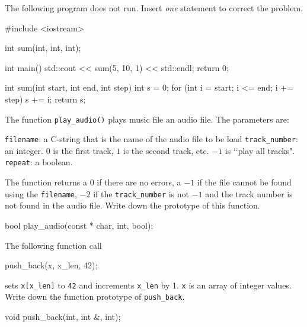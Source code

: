 

\nextq
The following program does not run.
Insert \textit{one} statement to correct the problem.
\\
\ANSWER
\begin{answercode}
#include <iostream>

int sum(int, int, int);
  
int main()
{
    std::cout << sum(5, 10, 1) << std::endl;
    return 0;
}

int sum(int start, int end, int step)
{
    int s = 0;
    for (int i = start; i <= end; i += step)
    {
        s += i;
    }
    return s;
}
\end{answercode}

\nextq
The function \verb!play_audio()! plays music file an audio file. The parameters are:
\begin{enumerate}[nosep]
\li \verb!filename!: a C-string that is the name of the audio file to be load
\li \verb!track_number!: an integer.
$0$ is the first track, $1$ is the second track, etc.
$-1$ is \lq\lq play all tracks".
\li \verb!repeat!: a boolean.
\end{enumerate}
The function returns a $0$ if there are no errors,
a $-1$ if the file cannot be found using the \verb!filename!,
$-2$ if the \verb!track_number! is not $-1$ and the track number is not found
in the audio file.
Write down the prototype of this function.
\\
\ANSWER
\begin{answercode}
bool play_audio(const * char, int, bool);
\end{answercode}

\nextq
The following function call
\begin{console}
push_back(x, x_len, 42);
\end{console}
sets \verb!x[x_len]! to \verb!42! and increments \verb!x_len! by 1.
\verb!x! is an array of integer values.
Write down the function prototype of \verb!push_back!.
\\
\ANSWER
\begin{answercode}
void push_back(int, int &, int);
\end{answercode}


